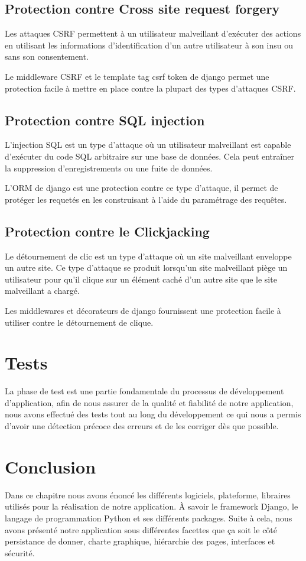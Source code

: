 \subsection{Protection contre Cross site request forgery}
Les attaques CSRF permettent à un utilisateur malveillant d'exécuter des actions 
en utilisant les informations d'identification d'un autre utilisateur à son insu 
ou sans son consentement.
        
Le middleware CSRF et le template tag csrf token de django permet une protection 
facile à mettre en place contre la plupart des types d'attaques CSRF.
    
\subsection{Protection contre SQL injection}
L'injection SQL est un type d'attaque où un utilisateur malveillant est capable 
d'exécuter du code SQL arbitraire sur une base de données. Cela peut entraîner 
la suppression d'enregistrements ou une fuite de données.
        
L’ORM de django est une protection contre ce type d’attaque, il permet de 
protéger les requetés en les construisant à l'aide du paramétrage des requêtes.

\subsection{Protection contre le Clickjacking}
Le détournement de clic est un type d'attaque où un site malveillant enveloppe 
un autre site. Ce type d’attaque se produit lorsqu’un site malveillant piège un 
utilisateur pour qu’il clique sur un élément caché d’un autre site que le site 
malveillant a chargé. 
        
Les middlewares et décorateurs de django fournissent une protection facile à 
utiliser contre le détournement de clique.
        
\section{Tests}
La phase de test est une partie fondamentale du processus de développement 
d’application, afin de nous assurer de la qualité et fiabilité de notre 
application, nous avons effectué des tests tout au long du développement ce qui 
nous a permis d’avoir une détection précoce des erreurs et de les corriger dès 
que possible.
    
\section{Conclusion}
Dans ce chapitre nous avons énoncé les différents logiciels, plateforme, 
libraires utilisés pour la réalisation de notre application. À savoir le 
framework Django, le langage de programmation Python et ses différents packages. 
Suite à cela, nous avons présenté notre application sous différentes facettes 
que ça soit le côté persistance de donner, charte graphique, hiérarchie des 
pages, interfaces et sécurité.      

